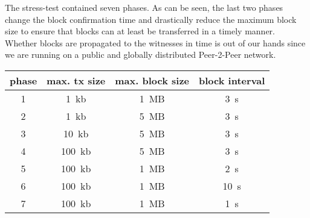 The stress-test contained seven phases. As can be seen, the last two phases
change the block confirmation time and drastically reduce the maximum block
size to ensure that blocks can at least be transferred in a timely manner.
Whether blocks are propagated to the witnesses in time is out of our hands
since we are running on a public and globally distributed Peer-2-Peer network.

\begin{tabular}{c|c|c|c}
 \textbf{phase} & \textbf{max. tx size} & \textbf{max. block size} & \textbf{block interval} \\\hline
 1 & \SI{1}{kb}   & \SI{1}{MB}  & \SI{3}{s} \\
 2 & \SI{1}{kb}   & \SI{5}{MB}  & \SI{3}{s} \\
 3 & \SI{10}{kb}  & \SI{5}{MB}  & \SI{3}{s} \\
 4 & \SI{100}{kb} & \SI{5}{MB}  & \SI{3}{s} \\
 5 & \SI{100}{kb} & \SI{1}{MB}  & \SI{2}{s} \\
 6 & \SI{100}{kb} & \SI{1}{MB}  & \SI{10}{s} \\
 7 & \SI{100}{kb} & \SI{1}{MB}  & \SI{1}{s} \\\hline
\end{tabular}
